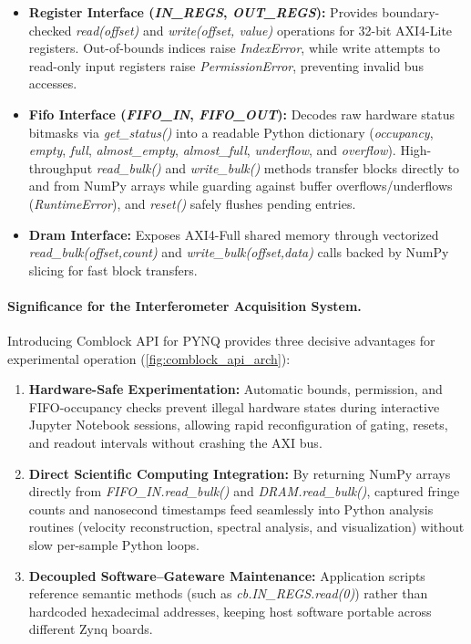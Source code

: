 \begin{itemize}
    \item \textbf{Register Interface (\emph{IN\_REGS}, \emph{OUT\_REGS}):} Provides boundary-checked \emph{read(offset)} and \emph{write(offset, value)} operations for 32-bit AXI4-Lite registers. Out-of-bounds indices raise \emph{IndexError}, while write attempts to read-only input registers raise \emph{PermissionError}, preventing invalid bus accesses.
    \item \textbf{Fifo Interface (\emph{FIFO\_IN}, \emph{FIFO\_OUT}):} Decodes raw hardware status bitmasks via \emph{get\_status()} into a readable Python dictionary (\emph{occupancy}, \emph{empty}, \emph{full}, \emph{almost\_empty}, \emph{almost\_full}, \emph{underflow}, and \emph{overflow}). High-throughput \emph{read\_bulk()} and \emph{write\_bulk()} methods transfer blocks directly to and from NumPy arrays while guarding against buffer overflows/underflows (\emph{RuntimeError}), and \emph{reset()} safely flushes pending entries.
    \item \textbf{Dram Interface:} Exposes AXI4-Full shared memory through vectorized
    \emph{read\_bulk}\allowbreak\emph{(offset,\allowbreak count)} and
    \emph{write\_bulk}\allowbreak\emph{(offset,\allowbreak data)} calls backed by NumPy slicing for fast block transfers.
\end{itemize}

\paragraph{Significance for the Interferometer Acquisition System.}
Introducing Comblock API for PYNQ provides three decisive advantages for experimental operation (\cref{fig:comblock_api_arch}):
\begin{enumerate}
    \item \textbf{Hardware-Safe Experimentation:} Automatic bounds, permission, and FIFO-occupancy checks prevent illegal hardware states during interactive Jupyter Notebook sessions, allowing rapid reconfiguration of gating, resets, and readout intervals without crashing the AXI bus.
    \item \textbf{Direct Scientific Computing Integration:} By returning NumPy arrays directly from \emph{FIFO\_IN.read\_bulk()} and \emph{DRAM.read\_bulk()}, captured fringe counts and nanosecond timestamps feed seamlessly into Python analysis routines (velocity reconstruction, spectral analysis, and visualization) without slow per-sample Python loops.
    \item \textbf{Decoupled Software–Gateware Maintenance:} Application scripts reference semantic methods (such as \emph{cb.IN\_REGS.read(0)}) rather than hardcoded hexadecimal addresses, keeping host software portable across different Zynq boards.
\end{enumerate}



